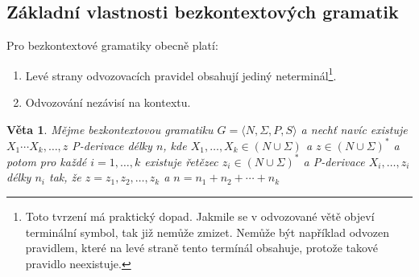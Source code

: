 \documentclass[10pt, a4paper, titlepage]{article}
\theoremstyle{note}
\newtheorem{veta}{\textbf{Věta}}
\begin{document}
\subsection{Základní vlastnosti bezkontextových gramatik}

Pro bezkontextové gramatiky obecně platí:
\begin{enumerate}		%
\item
Levé strany odvozovacích pravidel obsahují jediný neterminál\footnote{Toto tvrzení má praktický dopad. Jakmile se v odvozované větě objeví
terminální symbol, tak již nemůže zmizet. Nemůže být například odvozen pravidlem, které na levé straně tento termínál obsahuje, protože takové pravidlo neexistuje.}.

\item
Odvozování nezávisí na kontextu.
\end{enumerate}

\begin{veta}\label{veta-bez}
Mějme bezkontextovou gramatiku  $G = \langle N, \Sigma, P, S \rangle$ a nechť navíc existuje $X_{1} \cdots X_{k}, \ldots, z$
P-derivace délky $n$, kde $X_{1}, \ldots, X_{k} \in (N \cup \Sigma)$ a $z \in (N \cup \Sigma)^{*}$ 
a potom pro každé $i = 1, \ldots, k$  existuje řetězec $z_{i} \in (N \cup \Sigma)^{*}$ 
a P-derivace $X_{i}, \ldots, z_{i}$ délky $n_{i}$ tak, že $z = z_{1} ,z_{2}, \ldots, z_{k}$ a $n = n_{1} + n_{2} + \cdots + n_{k}$
\end{veta}
\end{document}
